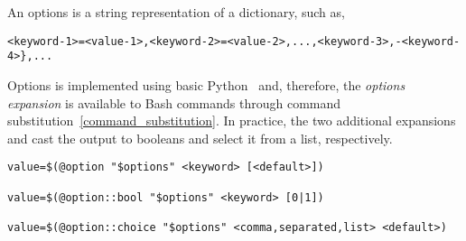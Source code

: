 
An options is a string representation of a dictionary, such as,
%
\begin{verbatim}
<keyword-1>=<value-1>,<keyword-2>=<value-2>,...,<keyword-3>,-<keyword-4>},...
\end{verbatim}
%
Options is implemented using basic Python~ and, therefore, the \emph{options expansion} is available to Bash commands through command substitution~\ref{command_substitution}. In practice, the two additional expansions  and  cast the output to booleans and select it from a list, respectively.
%
\begin{verbatim}
value=$(@option "$options" <keyword> [<default>])

value=$(@option::bool "$options" <keyword> [0|1])

value=$(@option::choice "$options" <comma,separated,list> <default>)
\end{verbatim}
